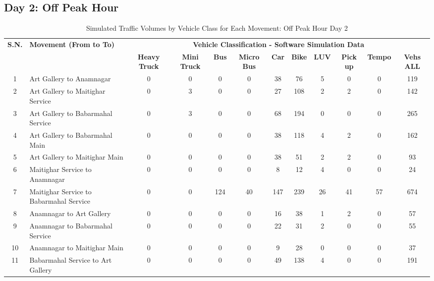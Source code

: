 \begin{landscape}
\begin{table}[h]
\begin{tabular}{|c|p{6cm}|c|c|c|c|c|c|c|c|c|c|}
\end{tabular}
\end{table}
\end{landscape}


\begin{landscape}
\section{Day 2: Off Peak Hour}
\centering
\begin{table}[h]
\centering
\caption{Simulated Traffic Volumes by Vehicle Class for Each Movement: Off Peak Hour Day 2}
\small
\setlength{\tabcolsep}{5pt}

\begin{tabular}{|c|p{6cm}|c|c|c|c|c|c|c|c|c|c|}
\hline
\textbf{S.N.} & \textbf{Movement (From to To)} & \multicolumn{10}{c|}{\textbf{Vehicle Classification - Software Simulation Data}} \\
\cline{3-12}
& & \textbf{Heavy Truck} & \textbf{Mini Truck} & \textbf{Bus} & \textbf{Micro Bus} & \textbf{Car} & \textbf{Bike} & \textbf{LUV} & \textbf{Pick up} & \textbf{Tempo} & \textbf{Vehs ALL} \\
\hline
1 & Art Gallery to Anamnagar & 0 & 0 & 0 & 0 & 38 & 76 & 5 & 0 & 0 & 119 \\
\hline
2 & Art Gallery to Maitighar Service & 0 & 3 & 0 & 0 & 27 & 108 & 2 & 2 & 0 & 142 \\
\hline
3 & Art Gallery to Babarmahal Service & 0 & 3 & 0 & 0 & 68 & 194 & 0 & 0 & 0 & 265 \\
\hline
4 & Art Gallery to Babarmahal Main & 0 & 0 & 0 & 0 & 38 & 118 & 4 & 2 & 0 & 162 \\
\hline
5 & Art Gallery to Maitighar Main & 0 & 0 & 0 & 0 & 38 & 51 & 2 & 2 & 0 & 93 \\
\hline
6 & Maitighar Service to Anamnagar & 0 & 0 & 0 & 0 & 8 & 12 & 4 & 0 & 0 & 24 \\
\hline
7 & Maitighar Service to Babarmahal Service & 0 & 0 & 124 & 40 & 147 & 239 & 26 & 41 & 57 & 674 \\
\hline
8 & Anamnagar to Art Gallery & 0 & 0 & 0 & 0 & 16 & 38 & 1 & 2 & 0 & 57 \\
\hline
9 & Anamnagar to Babarmahal Service & 0 & 0 & 0 & 0 & 22 & 31 & 2 & 0 & 0 & 55 \\
\hline
10 & Anamnagar to Maitighar Main & 0 & 0 & 0 & 0 & 9 & 28 & 0 & 0 & 0 & 37 \\
\hline
11 & Babarmahal Service to Art Gallery & 0 & 0 & 0 & 0 & 49 & 138 & 4 & 0 & 0 & 191 \\

\end{tabular}
\end{table}
\end{landscape}
